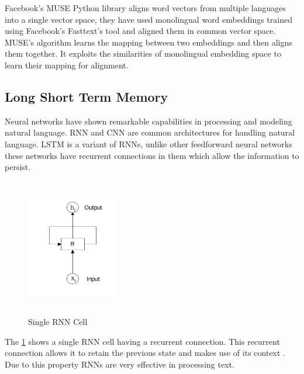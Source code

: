 Facebook's MUSE Python library \cite{conneau2017word} aligns word vectors from multiple languages into a single vector space, they have used monolingual word embeddings trained using Facebook's Fasttext's \cite{bojanowski2017enriching} tool and aligned them in common vector space. MUSE's algorithm learns the mapping between two embeddings and then aligns them together. It exploits the similarities of monolingual embedding space \cite{mikolov2013exploiting} to learn their mapping for alignment.

\subsection{Long Short Term Memory}
Neural networks have shown remarkable capabilities in processing and modeling natural language. \gls{RNN} and \gls{CNN} are common architectures for handling natural language. \gls{LSTM} \cite{hochreiter1997long} is a variant of \gls{RNN}s, unlike other feedforward neural networks these networks have recurrent connections in them which allow the information to persist.

\begin{figure}[!ht]
    \centering
    \includegraphics[width=4cm,height=6cm,keepaspectratio]{pics/rnn_cell.jpg}
    \captionsetup{justification=centering,margin=2cm}
    \caption{Single RNN Cell}
    \label{fig:rnn_single_cell}
\end{figure}

The \ref{fig:rnn_single_cell} shows a single \gls{RNN} cell having a recurrent connection. This recurrent connection allows it to retain the previous state and makes use of its context \cite{graves2009novel}. Due to this property \glspl{RNN} are very effective in processing text. 

